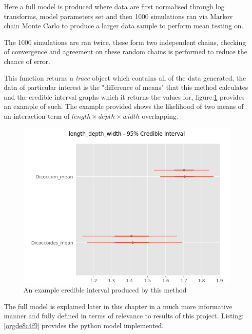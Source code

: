 \documentclass[11pt]{report}
\begin{document}
Here a full model is produced where data are first normalised through log transforms, model parameters set and then 1000 simulations ran via Markov chain Monte Carlo to produce a larger data sample to perform mean testing on.

The 1000 simulations are ran twice, these form two independent chains, checking of convergence and agreement on these random chains is performed to reduce the chance of error.

This function returns a \emph{trace} object which contains all of the data generated, the data of particular interest is the "difference of means" that this method calculates and the credible interval graphs which it returns the values for, figure:\ref{fig:orgb52f1be} provides an example of such. The example provided shows the likelihood of two means of an interaction term of
\(length \times  depth \times width\) overlapping.

\begin{figure}[htbp]
\centering
\includegraphics[width=15cm]{./images/ci.png}
\caption{\label{fig:orgb52f1be}
An example credible interval produced by this method}
\end{figure}


The full model is explained later in this chapter in a much more informative manner and fully defined in terms of relevance to results of this project. Listing:\ref{orgde8c4f9} provides the python model implemented.
\end{document}
